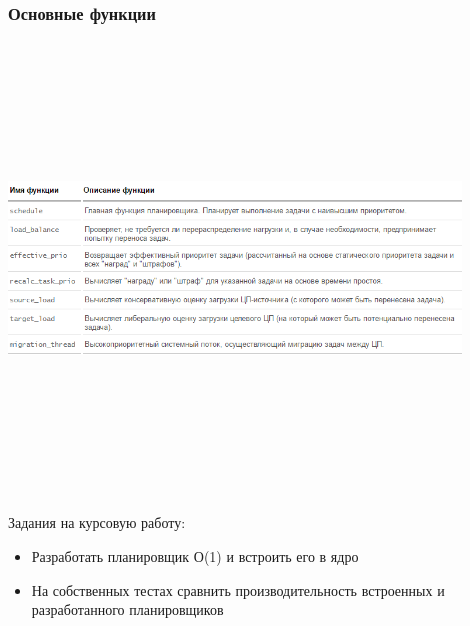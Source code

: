 \documentclass[10pt]{beamer}
\begin{document}
\begin{frame}\frametitle{Основные функции}
\center
\includegraphics[width=12cm, height=12cm,keepaspectratio]{sched7}
\end{frame}

\begin{frame}
Задания на курсовую работу:
\begin{itemize}
\item Разработать планировщик О(1) и встроить его в ядро
\item На собственных тестах сравнить производительность встроенных и разработанного планировщиков
\end{itemize}
\end{frame}
\end{document}
